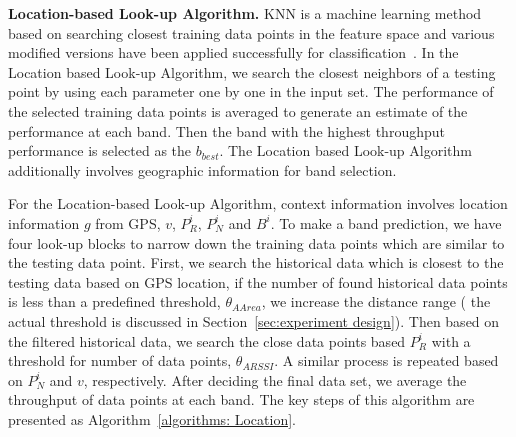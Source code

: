 
{\bf Location-based Look-up Algorithm.} KNN is a machine learning method
based on searching closest training data points in the feature space and various
modified versions have been applied successfully for classification~\cite{zhang2006svm}.
In the Location based Look-up Algorithm, we search the closest neighbors of 
a testing point by using each parameter one by one in the input set. The 
performance of the selected training data points is averaged to generate an estimate of the performance at each band. Then
the band with the highest throughput performance is selected as the $b_{best}$.
The Location based Look-up Algorithm additionally involves geographic information 
for band selection.

For the Location-based Look-up Algorithm, 
context information involves location information $g$ from GPS, $v$, $P_R^i$, $P_N^i$ 
and $B^i$. To make a band prediction, we have four look-up blocks to narrow 
down the training data points which are similar to the testing data point. First,
we search the historical data which is closest to the testing data based on GPS location, 
if the number of found historical data points is less than a predefined threshold, 
 $\theta_{AArea}$, we increase the distance range ( the actual threshold is discussed in 
Section~\ref{sec:experiment design}). Then based on the filtered historical data,
we search the close data points based $P_R^i$ with a threshold for number of data points, 
$\theta_{ARSSI}$. A similar process is repeated based on $P_N^i$ and $v$, respectively.
After deciding the final data set, we average the throughput of data points at each band.
The key steps of this algorithm are presented as Algorithm~\ref{algorithms: Location}.


